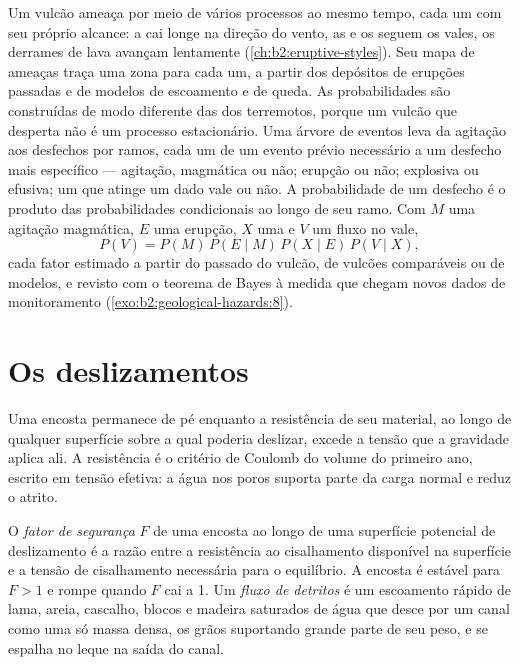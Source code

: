 Um vulcão ameaça por meio de vários processos ao mesmo tempo, cada um com seu próprio alcance: a  cai longe
na direção do vento, as  e os  seguem os vales, os derrames de lava avançam lentamente
(\cref{ch:b2:eruptive-styles}). Seu mapa de ameaças traça uma zona para cada um, a partir dos depósitos de erupções
passadas e de modelos de escoamento e de queda. As probabilidades são construídas de modo diferente das dos
terremotos, porque um vulcão que desperta não é um processo estacionário. Uma árvore de eventos leva
da agitação aos desfechos por ramos, cada um de um evento prévio necessário a um desfecho mais
específico --- agitação, magmática ou não; erupção ou não; explosiva ou efusiva; um 
que atinge um dado vale ou não. A probabilidade de um desfecho é o produto das probabilidades
condicionais ao longo de seu ramo. Com $M$ uma agitação magmática, $E$ uma erupção, $X$ uma  e $V$ um fluxo no vale,
\begin{equation*}
P(V) = P(M) \, P(E \mid M) \, P(X \mid E) \, P(V \mid X),
\end{equation*}
cada fator estimado a partir do passado do vulcão, de vulcões comparáveis ou de modelos, e revisto com
o teorema de Bayes à medida que chegam novos dados de monitoramento (\cref{exo:b2:geological-hazards:8}).

\section{Os deslizamentos}\label{sec:b2:geological-hazards:landslides}

Uma encosta permanece de pé enquanto a resistência de seu material, ao longo de qualquer superfície sobre a qual poderia deslizar,
excede a tensão que a gravidade aplica ali. A resistência é o critério de Coulomb do volume do primeiro
ano, escrito em tensão efetiva: a água nos poros suporta parte da carga normal e
reduz o atrito.

\begin{definition}\label{def:b2:geological-hazards:slope}
O \emph{fator de segurança} $F$ de uma encosta ao longo de uma superfície potencial de deslizamento
é a razão entre a resistência ao cisalhamento disponível na superfície e a tensão de cisalhamento necessária para o
equilíbrio. A encosta é estável para $F > 1$ e rompe quando $F$ cai a 1. Um \emph{fluxo de
detritos} é um escoamento rápido de lama, areia, cascalho, blocos e madeira saturados de água
que desce por um canal como uma só massa densa, os grãos suportando grande parte de seu peso, e se espalha
no leque na saída do canal.
\end{definition}

